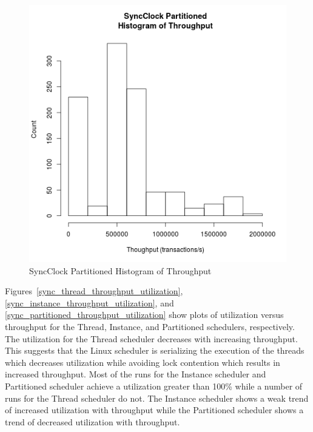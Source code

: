 \begin{figure}
\center
\includegraphics[height=.4\textheight]{sync_partitioned_throughput_hist.png}
\caption{SyncClock Partitioned Histogram of Throughput}
\label{sync_partitioned_throughput}
\end{figure}

Figures~\ref{sync_thread_throughput_utilization}, \ref{sync_instance_throughput_utilization}, and \ref{sync_partitioned_throughput_utilization} show plots of utilization versus throughput for the Thread, Instance, and Partitioned schedulers, respectively.
The utilization for the Thread scheduler decreases with increasing throughput.
This suggests that the Linux scheduler is serializing the execution of the threads which decreases utilization while avoiding lock contention which results in increased throughput.
Most of the runs for the Instance scheduler and Partitioned scheduler achieve a utilization greater than 100\% while a number of runs for the Thread scheduler do not.
The Instance scheduler shows a weak trend of increased utilization with throughput while the Partitioned scheduler shows a trend of decreased utilization with throughput.

